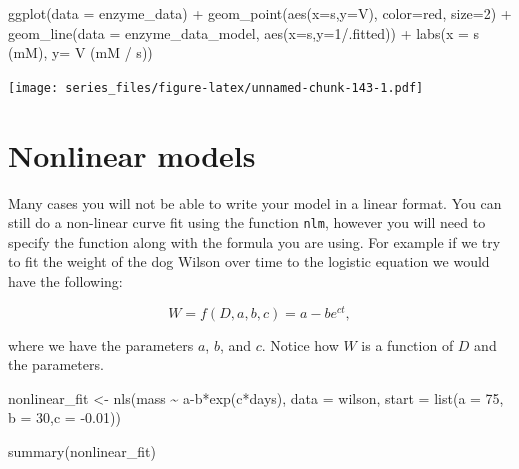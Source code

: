 \documentclass[
]{book}
\newenvironment{Shaded}{\begin{snugshade}}{\end{snugshade}}
\newcommand{\AttributeTok}[1]{\textcolor[rgb]{0.77,0.63,0.00}{#1}}
\newcommand{\DecValTok}[1]{\textcolor[rgb]{0.00,0.00,0.81}{#1}}
\newcommand{\FloatTok}[1]{\textcolor[rgb]{0.00,0.00,0.81}{#1}}
\newcommand{\FunctionTok}[1]{\textcolor[rgb]{0.00,0.00,0.00}{#1}}
\newcommand{\NormalTok}[1]{#1}
\newcommand{\OtherTok}[1]{\textcolor[rgb]{0.56,0.35,0.01}{#1}}
\newcommand{\SpecialCharTok}[1]{\textcolor[rgb]{0.00,0.00,0.00}{#1}}
\newcommand{\StringTok}[1]{\textcolor[rgb]{0.31,0.60,0.02}{#1}}
\theoremstyle{definition}
\theoremstyle{definition}
\theoremstyle{definition}
\theoremstyle{remark}
\begin{document}
\begin{Shaded}
\begin{Highlighting}[]
\FunctionTok{ggplot}\NormalTok{(}\AttributeTok{data =}\NormalTok{ enzyme\_data) }\SpecialCharTok{+}
  \FunctionTok{geom\_point}\NormalTok{(}\FunctionTok{aes}\NormalTok{(}\AttributeTok{x=}\NormalTok{s,}\AttributeTok{y=}\NormalTok{V),}
             \AttributeTok{color=}\StringTok{\textquotesingle{}red\textquotesingle{}}\NormalTok{,}
             \AttributeTok{size=}\DecValTok{2}\NormalTok{) }\SpecialCharTok{+}
  \FunctionTok{geom\_line}\NormalTok{(}\AttributeTok{data =}\NormalTok{ enzyme\_data\_model,}
            \FunctionTok{aes}\NormalTok{(}\AttributeTok{x=}\NormalTok{s,}\AttributeTok{y=}\DecValTok{1}\SpecialCharTok{/}\NormalTok{.fitted)) }\SpecialCharTok{+}
  \FunctionTok{labs}\NormalTok{(}\AttributeTok{x =} \StringTok{\textquotesingle{}s (mM)\textquotesingle{}}\NormalTok{,}
       \AttributeTok{y=} \StringTok{\textquotesingle{}V (mM / s)\textquotesingle{}}\NormalTok{)}
\end{Highlighting}
\end{Shaded}

\texttt{[image: series\_files/figure-latex/unnamed-chunk-143-1.pdf]}

\hypertarget{nonlinear-models}{%
\section{Nonlinear models}\label{nonlinear-models}}

Many cases you will not be able to write your model in a linear format. You can still do a non-linear curve fit using the function \texttt{nlm}, however you will need to specify the function along with the formula you are using. For example if we try to fit the weight of the dog Wilson over time to the logistic equation we would have the following:

\begin{equation}
W =f(D,a,b,c)= a - be^{ct},
\end{equation}

where we have the parameters \(a\), \(b\), and \(c\). Notice how \(W\) is a function of \(D\) and the parameters.

\begin{Shaded}
\begin{Highlighting}[]
\NormalTok{nonlinear\_fit }\OtherTok{\textless{}{-}} \FunctionTok{nls}\NormalTok{(mass }\SpecialCharTok{\textasciitilde{}}\NormalTok{ a}\SpecialCharTok{{-}}\NormalTok{b}\SpecialCharTok{*}\FunctionTok{exp}\NormalTok{(c}\SpecialCharTok{*}\NormalTok{days), }
              \AttributeTok{data =}\NormalTok{ wilson, }
              \AttributeTok{start =} \FunctionTok{list}\NormalTok{(}\AttributeTok{a =} \DecValTok{75}\NormalTok{, }\AttributeTok{b =} \DecValTok{30}\NormalTok{,}\AttributeTok{c =} \SpecialCharTok{{-}}\FloatTok{0.01}\NormalTok{))}


\FunctionTok{summary}\NormalTok{(nonlinear\_fit)}
\end{Highlighting}
\end{Shaded}
\end{document}
